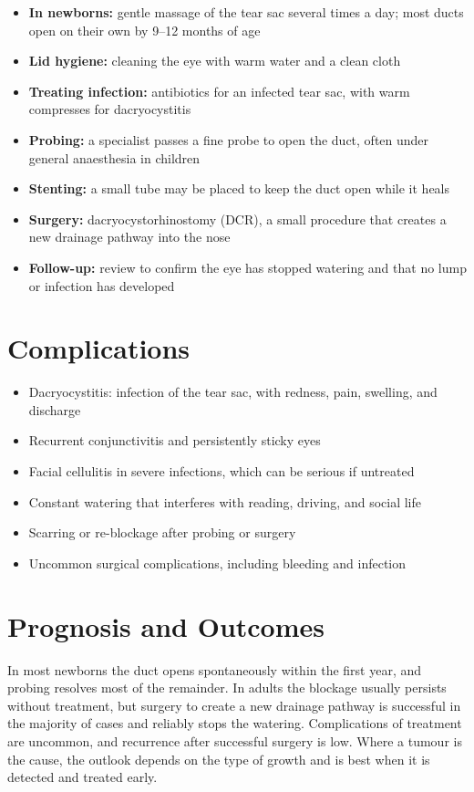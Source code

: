 \begin{itemize}
    \item \textbf{In newborns:} gentle massage of the tear sac several times a day; most ducts open on their own by 9--12 months of age
    \item \textbf{Lid hygiene:} cleaning the eye with warm water and a clean cloth
    \item \textbf{Treating infection:} antibiotics for an infected tear sac, with warm compresses for dacryocystitis
    \item \textbf{Probing:} a specialist passes a fine probe to open the duct, often under general anaesthesia in children
    \item \textbf{Stenting:} a small tube may be placed to keep the duct open while it heals
    \item \textbf{Surgery:} dacryocystorhinostomy (DCR), a small procedure that creates a new drainage pathway into the nose
    \item \textbf{Follow-up:} review to confirm the eye has stopped watering and that no lump or infection has developed
\end{itemize}

\section*{Complications}
\begin{itemize}
    \item Dacryocystitis: infection of the tear sac, with redness, pain, swelling, and discharge
    \item Recurrent conjunctivitis and persistently sticky eyes
    \item Facial cellulitis in severe infections, which can be serious if untreated
    \item Constant watering that interferes with reading, driving, and social life
    \item Scarring or re-blockage after probing or surgery
    \item Uncommon surgical complications, including bleeding and infection
\end{itemize}

\section*{Prognosis and Outcomes}
In most newborns the duct opens spontaneously within the first year, and probing resolves most of the remainder. In adults the blockage usually persists without treatment, but surgery to create a new drainage pathway is successful in the majority of cases and reliably stops the watering. Complications of treatment are uncommon, and recurrence after successful surgery is low. Where a tumour is the cause, the outlook depends on the type of growth and is best when it is detected and treated early.

